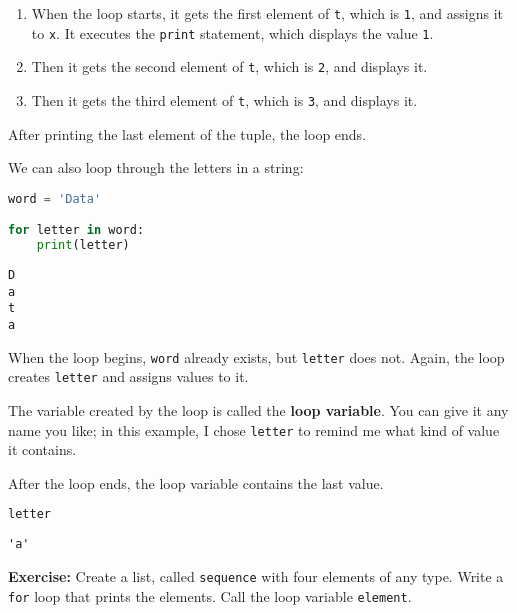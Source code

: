 \begin{enumerate}
\def\labelenumi{\arabic{enumi}.}
\item
  When the loop starts, it gets the first element of
  \passthrough{\lstinline!t!}, which is \passthrough{\lstinline!1!}, and
  assigns it to \passthrough{\lstinline!x!}. It executes the
  \passthrough{\lstinline!print!} statement, which displays the value
  \passthrough{\lstinline!1!}.
\item
  Then it gets the second element of \passthrough{\lstinline!t!}, which
  is \passthrough{\lstinline!2!}, and displays it.
\item
  Then it gets the third element of \passthrough{\lstinline!t!}, which
  is \passthrough{\lstinline!3!}, and displays it.
\end{enumerate}

After printing the last element of the tuple, the loop ends.

We can also loop through the letters in a string:

\begin{lstlisting}[language=Python,style=source]
word = 'Data'

for letter in word:
    print(letter)
\end{lstlisting}

\begin{lstlisting}[style=output]
D
a
t
a
\end{lstlisting}

When the loop begins, \passthrough{\lstinline!word!} already exists, but
\passthrough{\lstinline!letter!} does not. Again, the loop creates
\passthrough{\lstinline!letter!} and assigns values to it.

The variable created by the loop is called the \textbf{loop variable}.
You can give it any name you like; in this example, I chose
\passthrough{\lstinline!letter!} to remind me what kind of value it
contains.

After the loop ends, the loop variable contains the last value.

\begin{lstlisting}[language=Python,style=source]
letter
\end{lstlisting}

\begin{lstlisting}[style=output]
'a'
\end{lstlisting}

\textbf{Exercise:} Create a list, called
\passthrough{\lstinline!sequence!} with four elements of any type. Write
a \passthrough{\lstinline!for!} loop that prints the elements. Call the
loop variable \passthrough{\lstinline!element!}.

